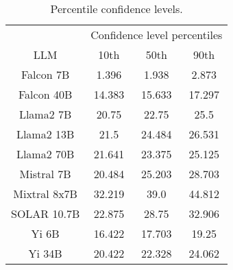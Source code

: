 \begin{table*}
\centering
\begin{tabular}{c|c|c|c}
& \multicolumn{3}{c}{Confidence level percentiles} \\ 
LLM & 10th & 50th & 90th\\ \hline
Falcon 7B & 1.396 & 1.938 & 2.873\\
Falcon 40B & 14.383 & 15.633 & 17.297\\
Llama2 7B & 20.75 & 22.75 & 25.5\\
Llama2 13B & 21.5 & 24.484 & 26.531\\
Llama2 70B & 21.641 & 23.375 & 25.125\\
Mistral 7B & 20.484 & 25.203 & 28.703\\
Mixtral 8x7B & 32.219 & 39.0 & 44.812\\
SOLAR 10.7B & 22.875 & 28.75 & 32.906\\
Yi 6B & 16.422 & 17.703 & 19.25\\
Yi 34B & 20.422 & 22.328 & 24.062\\
\hline
\end{tabular}
\caption{Percentile confidence levels.}
\label{tab:percentile_conf}
\end{table*}
